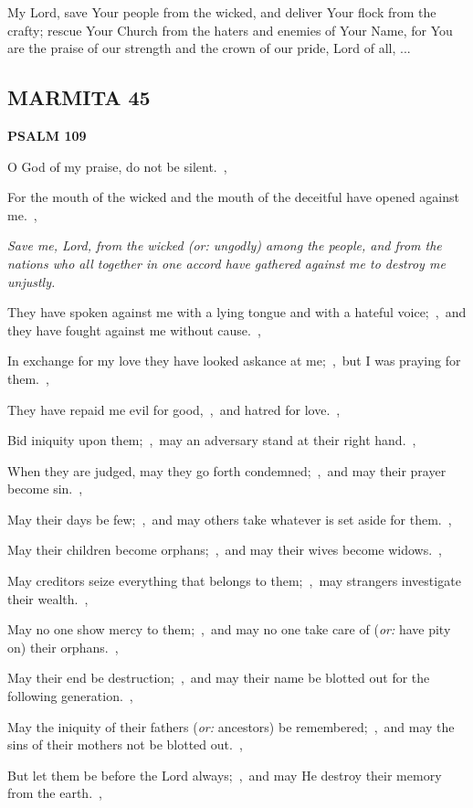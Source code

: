 \documentclass[12pt,twoside,a5paper]{article}
\newcommand{\marmita}[1]{\subsection*{MARMITA {#1}}}
\newcommand{\psalm}[1]{\textbf{PSALM {#1}}\nopagebreak}
\newcommand{\qanona}[1]{{\liturgicalhint{Qanona.} \emph{#1}}}
\newcommand{\slota}[1]{\liturgicalhint{Slota.} #1}
\newcommand{\translationoption}[1]{\emph{or:} #1}
\begin{document}
\slota{My Lord, save Your people from the wicked, and deliver Your flock from the crafty; rescue Your Church from the haters and enemies of Your Name, for You are the praise of our strength and the crown of our pride, Lord of all, ...}

\marmita{45}

\psalm{109}

\begin{normalparskip}
  O God of my praise, do not be silent.~\sep

  For the mouth of the wicked and the mouth of the deceitful have opened against me.~\sep

  \qanona{Save me, Lord, from the wicked (\translationoption{ungodly}) among the people, and from the nations who all together in one accord have gathered against me to destroy me unjustly.}

  They have spoken against me with a lying tongue and with a hateful voice;~\sep\ and they have fought against me without cause.~\sep

  In exchange for my love they have looked askance at me;~\sep\ but I was praying for them.~\sep

  They have repaid me evil for good,~\sep\ and hatred for love.~\sep

  Bid iniquity upon them;~\sep\ may an adversary stand at their right hand.~\sep

  When they are judged, may they go forth condemned;~\sep\ and may their prayer become sin.~\sep

  May their days be few;~\sep\ and may others take whatever is set aside for them.~\sep

  May their children become orphans;~\sep\ and may their wives become widows.~\sep

  May creditors seize everything that belongs to them;~\sep\ may strangers investigate their wealth.~\sep

  May no one show mercy to them;~\sep\ and may no one take care of (\translationoption{have pity on}) their orphans.~\sep

  May their end be destruction;~\sep\ and may their name be blotted out for the following generation.~\sep

  May the iniquity of their fathers (\translationoption{ancestors}) be remembered;~\sep\ and may the sins of their mothers not be blotted out.~\sep

  But let them be before the Lord always;~\sep\ and may He destroy their memory from the earth.~\sep


\end{normalparskip}
\end{document}
